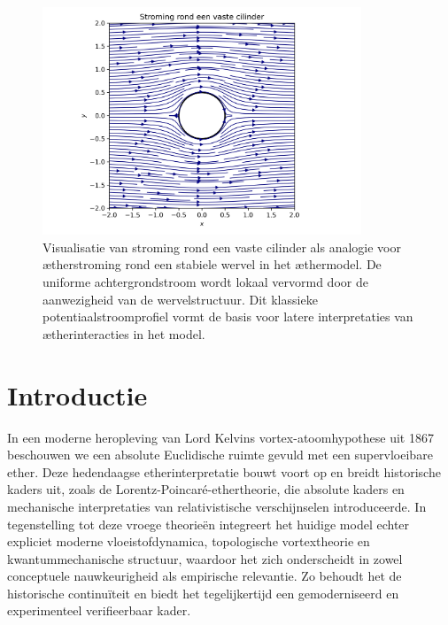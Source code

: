 \begin{figure}[htbp]
    \centering
    \includegraphics[width=0.85\textwidth]{02_cylinder_flow}
    \caption{Visualisatie van stroming rond een vaste cilinder als analogie voor ætherstroming rond een stabiele wervel in het æthermodel. De uniforme achtergrondstroom wordt lokaal vervormd door de aanwezigheid van de wervelstructuur. Dit klassieke potentiaalstroomprofiel vormt de basis voor latere interpretaties van ætherinteracties in het model.}
    \label{fig:cylinderflow}
\end{figure}

\section{Introductie}
In een moderne heropleving van Lord Kelvins vortex-atoomhypothese uit 1867~\cite{Kelvin1867-vortex} beschouwen we een absolute Euclidische ruimte gevuld met een supervloeibare ether. Deze hedendaagse etherinterpretatie bouwt voort op en breidt historische kaders uit, zoals de Lorentz-Poincaré-ethertheorie, die absolute kaders en mechanische interpretaties van relativistische verschijnselen introduceerde. In tegenstelling tot deze vroege theorieën integreert het huidige model echter expliciet moderne vloeistofdynamica, topologische vortextheorie en kwantummechanische structuur, waardoor het zich onderscheidt in zowel conceptuele nauwkeurigheid als empirische relevantie. Zo behoudt het de historische continuïteit en biedt het tegelijkertijd een gemoderniseerd en experimenteel verifieerbaar kader.

